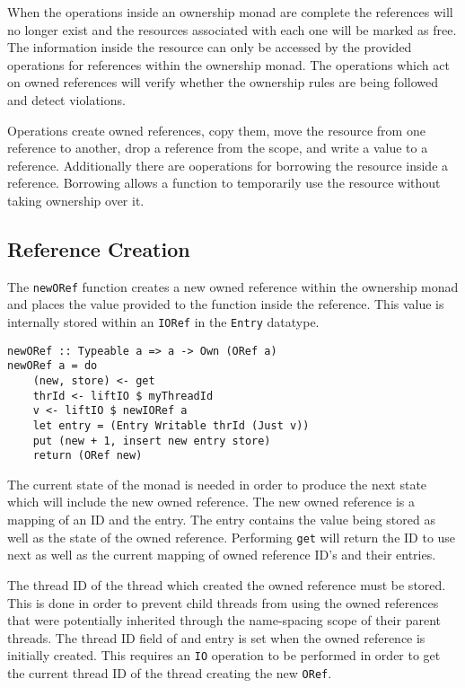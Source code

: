 \documentclass[onehalf,11pt]{beavtex}
\begin{document}
When the operations inside an ownership monad are complete the references
will no longer exist and the resources associated with each one will be marked
as free.
The information inside the resource can only be accessed by the provided
operations for references within the ownership monad.
The operations which act on owned references will verify whether the ownership
rules are being followed and detect violations.

Operations create owned references, copy them, move the resource from one
reference to another, drop a reference from the scope, and write a value to a
reference.
Additionally there are ooperations for borrowing the resource inside a reference.
Borrowing allows a function to temporarily use the resource without taking
ownership over it.

\subsection{Reference Creation}

The \texttt{newORef} function creates a new owned reference
within the ownership monad and places the value provided to the function
inside the reference. This value is internally stored within an \texttt{IORef}
in the \texttt{Entry} datatype.

\begin{verbatim}
newORef :: Typeable a => a -> Own (ORef a)
newORef a = do
    (new, store) <- get
    thrId <- liftIO $ myThreadId
    v <- liftIO $ newIORef a
    let entry = (Entry Writable thrId (Just v))
    put (new + 1, insert new entry store)
    return (ORef new)
\end{verbatim}

The current state of the monad is needed in order to produce the next state
which will include the new owned reference.
The new owned reference is a mapping of an ID and the entry. The entry
contains the value being stored as well as the state of the owned reference.
Performing \texttt{get} will return the ID to use next as well as the current
mapping of owned reference ID's and their entries.

The thread ID of the thread which created the owned reference must
be stored.  This is done in order to prevent child threads from using the owned
references that were potentially inherited through the name-spacing scope of
their parent threads.  The thread ID field of and entry is set when the owned
reference is initially created. This requires an \texttt{IO} operation to be
performed in order to get the current thread ID of the thread creating the
new \texttt{ORef}.
\end{document}
